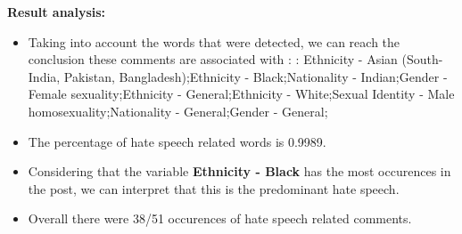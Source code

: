 \documentclass[11pt]{article}
\begin{document}
\textbf{\Large Result analysis:}

\begin{itemize}\item Taking into account the words that were detected, we can reach the conclusion these comments are associated with : : Ethnicity - Asian (South- India, Pakistan, Bangladesh);Ethnicity - Black;Nationality - Indian;Gender - Female sexuality;Ethnicity - General;Ethnicity - White;Sexual Identity - Male homosexuality;Nationality - General;Gender - General;%

\item The percentage of hate speech related words is 0.9989.

\item Considering that the variable \textbf{Ethnicity - Black} has the most occurences in the post, we can interpret that this is the predominant hate speech.

\item Overall there were 38/51 occurences of hate speech related comments.\end{itemize}
\end{document}
